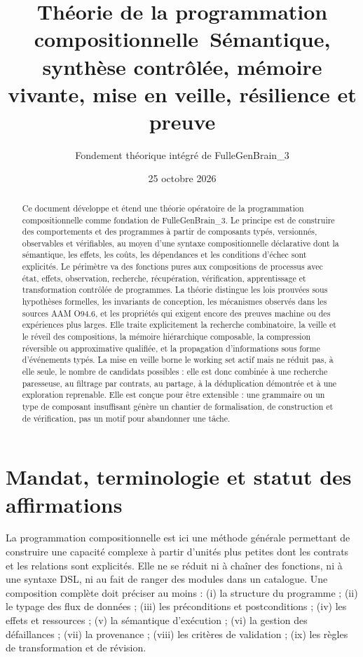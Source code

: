 \documentclass[11pt,a4paper]{article}
\title{Théorie de la programmation compositionnelle\
\large Sémantique, synthèse contrôlée, mémoire vivante, mise en veille, résilience et preuve}
\author{Fondement théorique intégré de FulleGenBrain\_3}
\date{25 octobre 2026}
\theoremstyle{definition}
\theoremstyle{plain}
\theoremstyle{remark}
\begin{document}
\maketitle
\begin{abstract}
Ce document développe et étend une théorie opératoire de la programmation compositionnelle comme fondation de FulleGenBrain\_3. Le principe est de construire des comportements et des programmes à partir de composants typés, versionnés, observables et vérifiables, au moyen d'une syntaxe compositionnelle déclarative dont la sémantique, les effets, les coûts, les dépendances et les conditions d'échec sont explicités. Le périmètre va des fonctions pures aux compositions de processus avec état, effets, observation, recherche, récupération, vérification, apprentissage et transformation contrôlée de programmes. La théorie distingue les lois prouvées sous hypothèses formelles, les invariants de conception, les mécanismes observés dans les sources AAM O94.6, et les propriétés qui exigent encore des preuves machine ou des expériences plus larges. Elle traite explicitement la recherche combinatoire, la veille et le réveil des compositions, la mémoire hiérarchique composable, la compression réversible ou approximative qualifiée, et la propagation d'informations sous forme d'événements typés. La mise en veille borne le working set actif mais ne réduit pas, à elle seule, le nombre de candidats possibles : elle est donc combinée à une recherche paresseuse, au filtrage par contrats, au partage, à la déduplication démontrée et à une exploration reprenable. Elle est conçue pour être extensible : une grammaire ou un type de composant insuffisant génère un chantier de formalisation, de construction et de vérification, pas un motif pour abandonner une tâche.
\end{abstract}
\newpage\setcounter{tocdepth}{1}\tableofcontents\newpage

\section{Mandat, terminologie et statut des affirmations}
La programmation compositionnelle est ici une méthode générale permettant de construire une capacité complexe à partir d'unités plus petites dont les contrats et les relations sont explicités. Elle ne se réduit ni à chaîner des fonctions, ni à une syntaxe DSL, ni au fait de ranger des modules dans un catalogue. Une composition complète doit préciser au moins : (i) la structure du programme ; (ii) le typage des flux de données ; (iii) les préconditions et postconditions ; (iv) les effets et ressources ; (v) la sémantique d'exécution ; (vi) la gestion des défaillances ; (vii) la provenance ; (viii) les critères de validation ; (ix) les règles de transformation et de révision.
\end{document}
